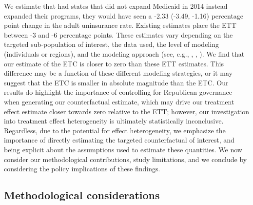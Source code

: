 We estimate that had states that did not expand Medicaid in 2014 instead expanded their programs, they would have seen a -2.33 (-3.49, -1.16) percentage point change in the adult uninsurance rate. Existing estimates place the ETT between -3 and -6 percentage points. These estimates vary depending on the targeted sub-population of interest, the data used, the level of modeling (individuals or regions), and the modeling approach (see, e.g., \cite{courtemanche2017early}, \cite{kaestner2017effects}, \cite{frean2017premium}). We find that our estimate of the ETC is closer to zero than these ETT estimates. This difference may be a function of these different modeling strategies, or it may suggest that the ETC is smaller in absolute magnitude than the ETC. Our results do highlight the importance of controlling for Republican governance when generating our counterfactual estimate, which may drive our treatment effect estimate closer towards zero relative to the ETT; however, our investigation into treatment effect heterogeneity is ultimately statistically inconclusive. Regardless, due to the potential for effect heterogeneity, we emphasize the importance of directly estimating the targeted counterfactual of interest, and being explicit about the assumptions used to estimate these quantities. We now consider our methodological contributions, study limitations, and we conclude by considering the policy implications of these findings.

\subsection{Methodological considerations}


